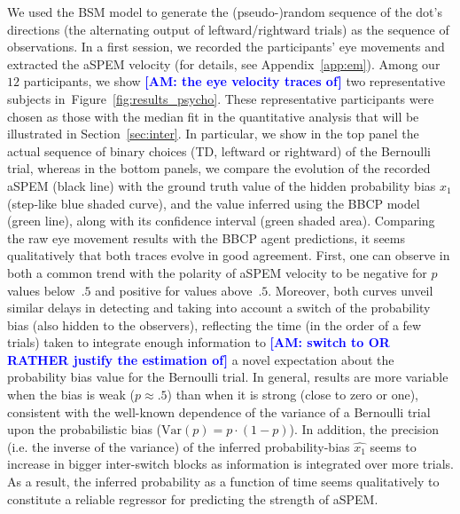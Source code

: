 \documentclass[12pt,english]{article}%
\newcommand{\seeFig}[1]{Figure~\ref{fig:#1}}
\newcommand{\seeApp}[1]{Appendix~\ref{app:#1}}
\newcommand{\seeSec}[1]{Section~\ref{sec:#1}}
\newcommand{\AM}[1]{\textbf{\textcolor{blue}{[AM: #1]}}}
\begin{document}
We used the BSM model to generate the (pseudo-)random sequence of
the dot's directions (the alternating output of leftward/rightward trials)
as the sequence of observations.
In a first session, we recorded the participants' eye movements and 
extracted the aSPEM velocity (for details, see \seeApp{em}).
Among our $12$ participants, we show \AM{the eye velocity traces of} two representative subjects in~\seeFig{results_psycho}.
These representative participants were chosen as those
with the median fit in the quantitative analysis
that will be illustrated in \seeSec{inter}.
In particular, we show in the top panel the actual sequence of binary choices
(TD, leftward or rightward) of the Bernoulli trial, whereas in the bottom panels, we compare the evolution of the recorded aSPEM (black line) with
the ground truth value of the hidden probability bias $x_1$ (step-like blue shaded curve),
and the value inferred using the BBCP model (green line), along with its confidence interval (green shaded area).
Comparing the raw eye movement results with the BBCP agent predictions,
it seems qualitatively that both traces evolve in good agreement.
First, one can observe in both a common trend with the polarity of aSPEM velocity
to be negative for $\hat{p}$ values below~$.5$ and positive for values above~$.5$.
Moreover, both curves unveil similar delays in detecting and taking into account a switch of the probability bias (also hidden to the observers),
reflecting the time (in the order of a few trials) taken to integrate enough information
to \AM{switch to OR RATHER justify the estimation of} a novel expectation about the probability bias value for the Bernoulli trial.
In general, results are more variable when the bias is weak ($p\approx .5$)
than when it is strong (close to zero or one),
consistent with the well-known dependence of the variance of a Bernoulli trial
upon the probabilistic bias ($\textrm{Var}(p)= p \cdot (1-p)$).
In addition, the precision (i.e. the inverse of the variance)
of the inferred probability-bias $\hat{x_1}$ seems to increase
in bigger inter-switch blocks as information is integrated over more trials.
As a result, the inferred probability as a function of time
seems qualitatively to constitute a reliable regressor
for predicting the strength of aSPEM.
\end{document}
